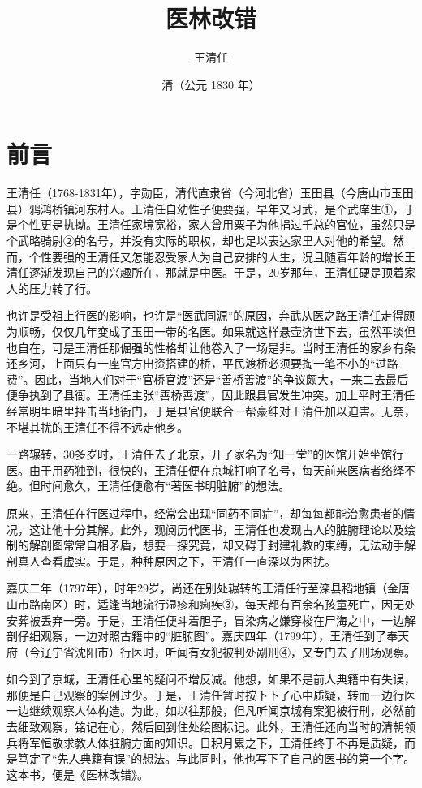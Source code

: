\documentclass[a4paper,12pt,UTF8,twoside]{ctexbook}
\title{\heiti\zihao{0} 医林改错}
\author{王清任}
\date{清（公元 1830 年）}
\begin{document}
	
	\maketitle
	\tableofcontents
	\frontmatter
	
	\chapter{前言}
	王清任（1768-1831年），字勋臣，清代直隶省（今河北省）玉田县（今唐山市玉田县）鸦鸿桥镇河东村人。王清任自幼性子便要强，早年又习武，是个武庠生①，于是个性更是执拗。王清任家境宽裕，家人曾用粟子为他捐过千总的官位，虽然只是个武略骑尉②的名号，并没有实际的职权，却也足以表达家里人对他的希望。然而，个性要强的王清任又怎能忍受家人为自己安排的人生，况且随着年龄的增长王清任逐渐发现自己的兴趣所在，那就是中医。于是，20岁那年，王清任硬是顶着家人的压力转了行。
	
	也许是受祖上行医的影响，也许是“医武同源”的原因，弃武从医之路王清任走得颇为顺畅，仅仅几年变成了玉田一带的名医。如果就这样悬壶济世下去，虽然平淡但也自在，可是王清任那倔强的性格却让他卷入了一场是非。当时王清任的家乡有条还乡河，上面只有一座官方出资搭建的桥，平民渡桥必须要掏一笔不小的“过路费”。因此，当地人们对于“官桥官渡”还是“善桥善渡”的争议颇大，一来二去最后便争执到了县衙。王清任主张“善桥善渡”，因此跟县官发生冲突。加上平时王清任经常明里暗里抨击当地衙门，于是县官便联合一帮豪绅对王清任加以迫害。无奈，不堪其扰的王清任不得不远走他乡。
	
	一路辗转，30多岁时，王清任去了北京，开了家名为“知一堂”的医馆开始坐馆行医。由于用药独到，很快的，王清任便在京城打响了名号，每天前来医病者络绎不绝。但时间愈久，王清任便愈有“著医书明脏腑”的想法。
	
	原来，王清任在行医过程中，经常会出现“同药不同症”，却每每都能治愈患者的情况，这让他十分其解。此外，观阅历代医书，王清任也发现古人的脏腑理论以及绘制的解剖图常常自相矛盾，想要一探究竟，却又碍于封建礼教的束缚，无法动手解剖真人查看虚实。于是，种种原因之下，王清任一直深以为困扰。
	
	嘉庆二年（1797年），时年29岁，尚还在别处辗转的王清任行至滦县稻地镇（金唐山市路南区）时，适逢当地流行湿疹和痢疾③，每天都有百余名孩童死亡，因无处安葬被丢弃一旁。于是，王清任便斗着胆子，冒染病之嫌穿梭在尸海之中，一边解剖仔细观察，一边对照古籍中的“脏腑图”。嘉庆四年（1799年），王清任到了奉天府（今辽宁省沈阳市）行医时，听闻有女犯被判处剐刑④，又专门去了刑场观察。
	
	如今到了京城，王清任心里的疑问不增反减。他想，如果不是前人典籍中有失误，那便是自己观察的案例过少。于是，王清任暂时按下下了心中质疑，转而一边行医一边继续观察人体构造。为此，如以往那般，但凡听闻京城有案犯被行刑，必然前去细致观察，铭记在心，然后回到住处绘图标记。此外，王清任还向当时的清朝领兵将军恒敬求教人体脏腑方面的知识。日积月累之下，王清任终于不再是质疑，而是笃定了“先人典籍有误”的想法。与此同时，他也写下了自己的医书的第一个字。这本书，便是《医林改错》。
	
\end{document}
